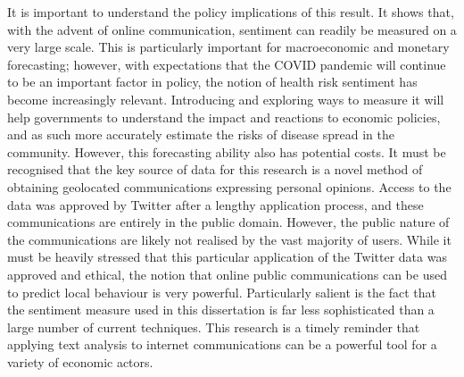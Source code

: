 \documentclass[12pt,a4]{article}
\newcommand\wordcount{}
\begin{document}
It is important to understand the policy implications of this result. It shows that, with the advent of online communication, sentiment can readily be measured on a very large scale. This is particularly important for macroeconomic and monetary forecasting; however, with expectations that the COVID pandemic will continue to be an important factor in policy, the notion of health risk sentiment has become increasingly relevant. Introducing and exploring ways to measure it will help governments to understand the impact and reactions to economic policies, and as such more accurately estimate the risks of disease spread in the community. However, this forecasting ability also has potential costs. It must be recognised that the key source of data for this research is a novel method of obtaining geolocated communications expressing personal opinions. Access to the data was approved by Twitter after a lengthy application process, and these communications are entirely in the public domain. However, the public nature of the communications are likely not realised by the vast majority of users. While it must be heavily stressed that this particular application of the Twitter data was approved and ethical, the notion that online public communications can be used to predict local behaviour is very powerful. Particularly salient is the fact that the sentiment measure used in this dissertation is far less sophisticated than a large number of current techniques. This research is a timely reminder that applying text analysis to internet communications can be a powerful tool for a variety of economic actors. 
\wordcount
\printbibliography



\appendix 


  
\end{document}
